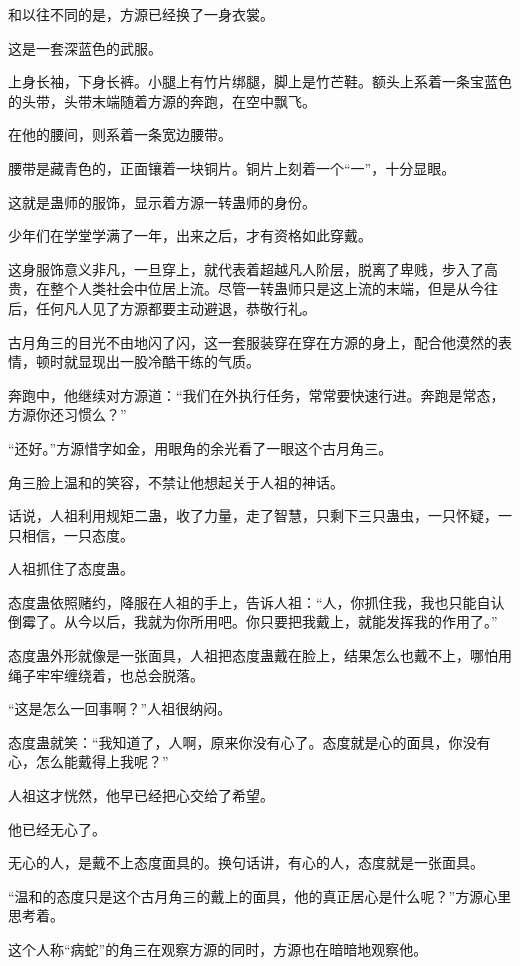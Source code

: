 \begin{this_body}
和以往不同的是，方源已经换了一身衣裳。

这是一套深蓝色的武服。

上身长袖，下身长裤。小腿上有竹片绑腿，脚上是竹芒鞋。额头上系着一条宝蓝色的头带，头带末端随着方源的奔跑，在空中飘飞。

在他的腰间，则系着一条宽边腰带。

腰带是藏青色的，正面镶着一块铜片。铜片上刻着一个“一”，十分显眼。

这就是蛊师的服饰，显示着方源一转蛊师的身份。

少年们在学堂学满了一年，出来之后，才有资格如此穿戴。

这身服饰意义非凡，一旦穿上，就代表着超越凡人阶层，脱离了卑贱，步入了高贵，在整个人类社会中位居上流。尽管一转蛊师只是这上流的末端，但是从今往后，任何凡人见了方源都要主动避退，恭敬行礼。

古月角三的目光不由地闪了闪，这一套服装穿在穿在方源的身上，配合他漠然的表情，顿时就显现出一股冷酷干练的气质。

奔跑中，他继续对方源道：“我们在外执行任务，常常要快速行进。奔跑是常态，方源你还习惯么？”

“还好。”方源惜字如金，用眼角的余光看了一眼这个古月角三。

角三脸上温和的笑容，不禁让他想起关于人祖的神话。

话说，人祖利用规矩二蛊，收了力量，走了智慧，只剩下三只蛊虫，一只怀疑，一只相信，一只态度。

人祖抓住了态度蛊。

态度蛊依照赌约，降服在人祖的手上，告诉人祖：“人，你抓住我，我也只能自认倒霉了。从今以后，我就为你所用吧。你只要把我戴上，就能发挥我的作用了。”

态度蛊外形就像是一张面具，人祖把态度蛊戴在脸上，结果怎么也戴不上，哪怕用绳子牢牢缠绕着，也总会脱落。

“这是怎么一回事啊？”人祖很纳闷。

态度蛊就笑：“我知道了，人啊，原来你没有心了。态度就是心的面具，你没有心，怎么能戴得上我呢？”

人祖这才恍然，他早已经把心交给了希望。

他已经无心了。

无心的人，是戴不上态度面具的。换句话讲，有心的人，态度就是一张面具。

“温和的态度只是这个古月角三的戴上的面具，他的真正居心是什么呢？”方源心里思考着。

这个人称“病蛇”的角三在观察方源的同时，方源也在暗暗地观察他。

\end{this_body}

